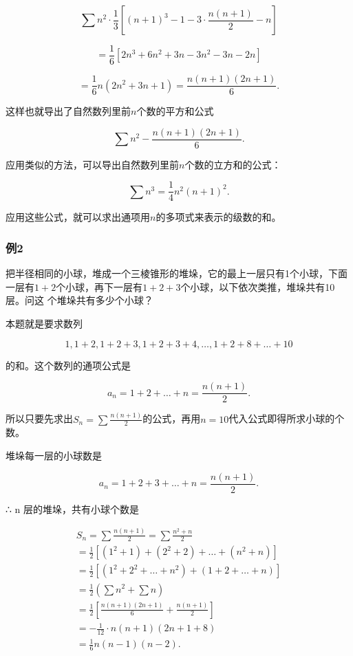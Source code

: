 \[
\sum n^{2} \cdot \frac{1}{3} \left[ (n + 1)^{3} - 1 - 3 \cdot \frac{n (n + 1)}{2} - n \right]
\]

\[
= \frac{1}{6} [ 2 n^{3} + 6 n^{2} + 3 n - 3 n^{2} - 3 n - 2 n ]
\]

\[
= \frac{1}{6} n (2 n^{2} + 3 n + 1) = \frac{n (n + 1) (2 n + 1)}{6}.
\]

这样也就导出了自然数列里前\(n\)个数的平方和公式

\[
\sum n^{2} - \frac{n (n + 1) (2 n + 1)}{6}.
\]

应用类似的方法，可以导出自然数列里前\(n\)个数的立方和的公式：

\[
\sum n^{3} = \frac{1}{4} n^{2} (n + 1)^{2}.
\]

应用这些公式，就可以求出通项用\(n\)的多项式来表示的级数的和。

\subsubsection{例2}

把半径相同的小球，堆成一个三棱锥形的堆垛，它的最上一层只有1个小球，下面一层有\(1 + 2\)个小球，再下一层有\(1 + 2 + 3\)个小球，以下依次类推，堆垛共有10层。问这
个堆垛共有多少个小球？

 本题就是要求数列

\[
1, 1 + 2, 1 + 2 + 3, 1 + 2 + 3 + 4, \dots, 1 + 2 + 8 + \dots + 10
\]

的和。这个数列的通项公式是

\[
a_{n} = 1 + 2 + \dots + n = \frac{n (n + 1)}{2}.
\]

所以只要先求出\(S_{n} = \sum \frac{n(n + 1)}{2}\)的公式，再用\(n = 10\)代入公式即得所求小球的个数。

 堆垛每一层的小球数是

\[
a_{n} = 1 + 2 + 3 + \dots + n = \frac{n (n + 1)}{2}.
\]

∴ n 层的堆垛，共有小球个数是

\[
\begin{array}{l} S_{n} = \sum \frac{n (n + 1)}{2} = \sum \frac{n^{2} + n}{2} \\ = \frac{1}{2} [ (1^{2} + 1) + (2^{2} + 2) + \dots + (n^{2} + n) ] \\ = \frac{1}{2} \left[ \left(1^{2} + 2^{2} + \dots + n^{2}\right) + (1 + 2 + \dots + n) \right] \\ = \frac{1}{2} (\sum n^{2} + \sum n) \\ = \frac{1}{2} \left[ \frac{n (n + 1) (2 n + 1)}{6} + \frac{n (n + 1)}{2} \right] \\ = - \frac{1}{12} \cdot n (n + 1) (2 n + 1 + 8) \\ = \frac{1}{6} n (n - 1) (n - 2). \\ \end{array}
\]

